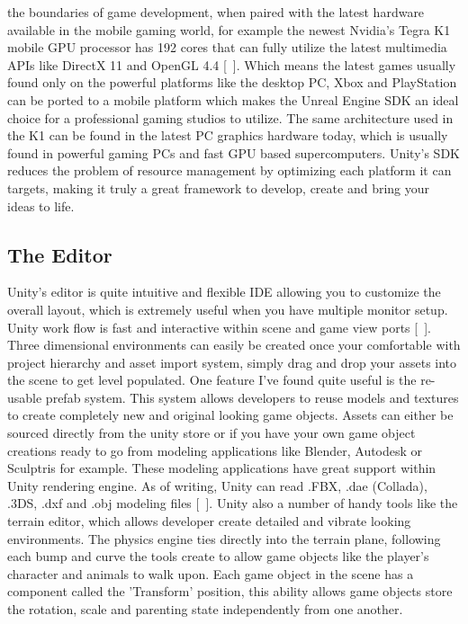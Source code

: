 the boundaries of game development, when paired with the latest hardware available in the mobile gaming world, for example the newest Nvidia’s Tegra K1 mobile GPU processor has 192 cores that can fully utilize the latest multimedia APIs like DirectX 11 and OpenGL 4.4 [~\cite{Nvidia-K1}]. Which means the latest games usually found only on the powerful platforms like the desktop PC, Xbox and PlayStation can be ported to a mobile platform which makes the Unreal Engine SDK an ideal choice for a professional gaming studios to utilize. The same architecture used in the K1 can be found in the latest PC graphics hardware today, which is usually found in powerful gaming PCs and fast GPU based supercomputers. Unity's SDK reduces the problem of resource management by optimizing each platform it can targets, making it truly a great framework to develop, create and bring your ideas to life.
\subsection{The Editor}
Unity's editor is quite intuitive and flexible IDE allowing you to customize the overall layout, which is extremely useful when you have multiple monitor setup. Unity work flow is fast and interactive within scene and game view ports [~\cite{The-Editor}]. Three dimensional environments can easily be created once your comfortable with project hierarchy and asset import system, simply drag and drop your assets into the scene to get level populated. One feature I've found quite useful is the re-usable prefab system. This system allows developers to reuse models and textures to create completely new and original looking game objects. Assets can either be sourced directly from the unity store or if you have your own game object creations ready to go from modeling applications like Blender, Autodesk or Sculptris for example. These modeling applications have great support within Unity rendering engine. As of writing, Unity can read .FBX, .dae (Collada), .3DS, .dxf and .obj modeling files [~\cite{Unity-Models-Support}]. Unity also a number of handy tools like the terrain editor, which allows developer create detailed and vibrate looking environments. The physics engine ties directly into the terrain plane, following each bump and curve the tools create to allow game objects like the player's character and animals to walk upon. Each game object in the scene has a component called the 'Transform' position, this ability allows game objects store the rotation, scale and parenting state independently from one another. 

